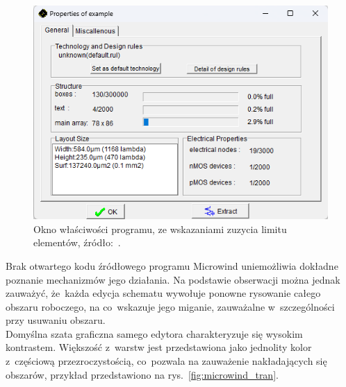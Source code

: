 \begin{figure}[h]
    \centering
    \includegraphics[width=.9\textwidth]{chapters/chapter2/img/microwind_opcje}
    \caption[Okno właściwości programu, ze wskazaniami zuzycia limitu elementów.]
    {
        Okno właściwości programu, ze wskazaniami zuzycia limitu elementów,
        źródło:~\cite{Microwind}.
    }
    \label{fig:microwind_limit}
\end{figure}

Brak otwartego kodu źródłowego programu Microwind uniemożliwia dokładne poznanie mechanizmów jego działania.
Na podstawie obserwacji można jednak zauważyć,
że~każda edycja schematu wywołuje ponowne rysowanie całego obszaru roboczego,
na co~wskazuje jego miganie, zauważalne w~szczególności przy usuwaniu obszaru.\\
\indent Domyślna szata graficzna samego edytora charakteryzuje się wysokim kontrastem.
Większość z~warstw jest przedstawiona jako jednolity kolor z~częściową przezroczystością,
co~pozwala na zauważenie nakładających się obszarów, przykład przedstawiono na rys.~\ref{fig:microwind_tran}.

